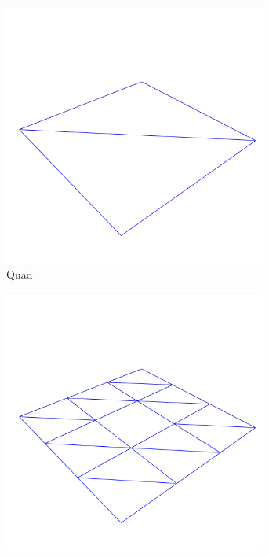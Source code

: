 \documentclass[crop=false,10pt,ngerman]{standalone}
\begin{document}
      \begin{figure}
        \begin{subfigure}[b]{0.24\textwidth}
          \center
          \includegraphics[trim={0 0 0 2cm},clip,width=0.95\textwidth]{images/model-quad-0.png}
          \caption{Quad}
        \end{subfigure}
        \begin{subfigure}[b]{0.24\textwidth}
          \center
          \includegraphics[trim={0 0 0 2cm},clip,width=0.95\textwidth]{images/model-ring-0.png}

\end{subfigure}
\end{figure}
\end{document}
